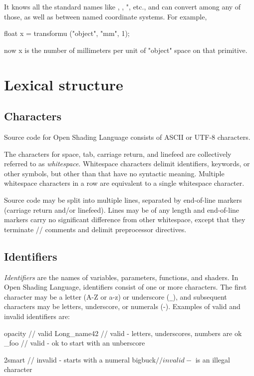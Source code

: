\documentclass[11pt,letterpaper]{book}
\def\langname{Open Shading Language\xspace}
\def\objectspace{{\cf "object"} space\xspace}
\begin{document}
It knows all the standard names like , , ",
etc., and can convert among any of those, as well as between named
coordinate systems.  For example,

\begin{code}
    float x = transformu ("object", "mm", 1);
\end{code}

now {\cf x} is the number of millimeters per unit of \objectspace on
that primitive.


\chapter{Lexical structure}
\label{chap:lexical}

\section{Characters}
\label{sec:lexical:chars}

Source code for \langname consists of ASCII or UTF-8 characters.

The characters for space, tab, carriage return, and linefeed are
collectively referred to as \emph{whitespace}.  Whitespace characters
delimit identifiers, keywords, or other symbols, but other than that
have no syntactic meaning.  Multiple whitespace characters in a row
are equivalent to a single whitespace character. 

Source code may be split into multiple lines, separated by end-of-line
markers (carriage return and/or linefeed).  Lines may be of any length
and end-of-line markers carry no significant difference from other 
whitespace, except that they terminate {\cf //} comments and delimit
preprocessor directives.

\section{Identifiers}
\label{sec:identifiers}

\emph{Identifiers} are the names of variables, parameters, functions,
and shaders.  In \langname, identifiers consist of one or more
characters.  The first character may be a letter ({\cf A}-{\cf Z} or
{\cf a}-{\cf z}) or underscore (\verb|_|), and subsequent characters may
be letters, underscore, or numerals ({}-{}).  Examples of
valid and invalid identifiers are:

\begin{code}
    opacity       // valid
    Long_name42   // valid - letters, underscores, numbers are ok
    _foo          // valid - ok to start with an unberscore

    2smart        // invalid - starts with a numeral
    bigbuck$      // invalid - $ is an illegal character
\end{code}
\end{document}
